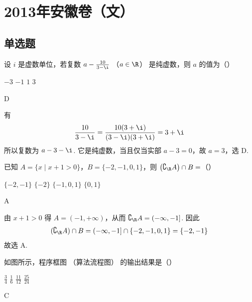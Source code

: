 \chapter{2013年安徽卷（文）}

\section{单选题}

\begin{problem}
设 \(i\) 是虚数单位，若复数 \(a - \frac{10}{3 - \i}\) （\(a \in \R\)） 是纯虚数，则 \(a\) 的值为（\quad）

\choices
    {\(-3\)}
    {\(-1\)}
    {\(1\)}
    {\(3\)}
\end{problem}

\begin{answer}
D
\end{answer}

\begin{solution}
有
\[
\frac{10}{3-\i}=\frac{10(3+\i)}{(3-\i)(3+\i)}=3+\i
\]
所以复数为 \(a-3-\i\). 它是纯虚数，当且仅当实部 \(a-3=0\)，故 \(a=3\)，选 D.
\end{solution}

\begin{problem}
已知 \(A = \{x \mid x + 1 > 0\}\)，\(B = \{-2, -1, 0, 1\}\)，则 \(\left(\complement_{\R} A\right) \cap B =\)（\quad）

\choices
    {\(\{-2, -1\}\)}
    {\(\{-2\}\)}
    {\(\{-1, 0, 1\}\)}
    {\(\{0, 1\}\)}
\end{problem}

\begin{answer}
A
\end{answer}

\begin{solution}
由 \(x+1>0\) 得 \(A=(-1,+\infty)\)，从而 \(\complement_{\R}A=(-\infty,-1]\). 因此
\[
(\complement_{\R}A)\cap B=(-\infty,-1]\cap\{-2,-1,0,1\}=\{-2,-1\}
\]
故选 A.
\end{solution}

\begin{problem}
如图所示，程序框图 （算法流程图） 的输出结果是（\quad）


\choices
    {\( \frac{3}{4} \)}
    {\( \frac{1}{6} \)}
    {\( \frac{11}{12} \)}
    {\( \frac{25}{24} \)}
\end{problem}

\begin{answer}
C
\end{answer}

